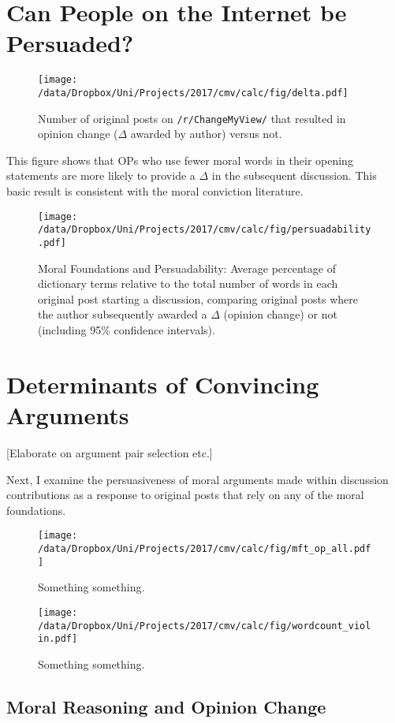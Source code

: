 \section{Can People on the Internet be Persuaded?}


\begin{figure}[ht]
\centering
\texttt{[image: /data/Dropbox/Uni/Projects/2017/cmv/calc/fig/delta.pdf]}
\caption{Number of original posts on \texttt{/r/ChangeMyView/} that resulted in opinion change ($\Delta$ awarded by author) versus not.}
\end{figure}

This figure shows that OPs who use fewer moral words in their opening statements are more likely to provide a \(\Delta\) in the subsequent discussion. This basic result is consistent with the moral conviction literature.

\begin{figure}[ht]
\centering
\texttt{[image: /data/Dropbox/Uni/Projects/2017/cmv/calc/fig/persuadability.pdf]}
\caption[Moral Foundations and Persuadability]{Moral Foundations and Persuadability: Average percentage of dictionary terms relative to the total number of words in each original post starting a discussion, comparing original posts where the author subsequently awarded a $\Delta$ (opinion change) or not (including 95\% confidence intervals).}
\end{figure}


\section{Determinants of Convincing Arguments}

{[}Elaborate on argument pair selection etc.{]}

Next, I examine the persuasiveness of moral arguments made within discussion contributions as a response to original posts that rely on any of the moral foundations.

\begin{figure}[ht]
\centering
\texttt{[image: /data/Dropbox/Uni/Projects/2017/cmv/calc/fig/mft\_op\_all.pdf]}
\caption{Something something.}
\end{figure}


\begin{figure}[ht]
\centering
\texttt{[image: /data/Dropbox/Uni/Projects/2017/cmv/calc/fig/wordcount\_violin.pdf]}
\caption{Something something.}
\end{figure}


\subsection{Moral Reasoning and Opinion Change}

